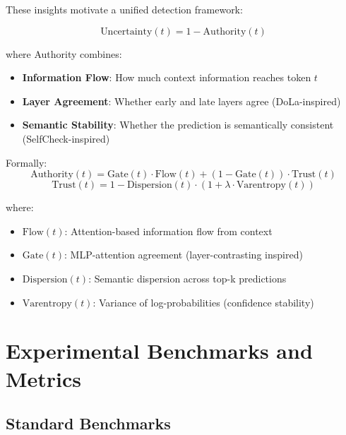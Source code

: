 \documentclass[11pt]{article}
\begin{document}
These insights motivate a unified detection framework:

\begin{equation}
\text{Uncertainty}(t) = 1 - \text{Authority}(t)
\end{equation}

where Authority combines:
\begin{itemize}
    \item \textbf{Information Flow}: How much context information reaches token $t$
    \item \textbf{Layer Agreement}: Whether early and late layers agree (DoLa-inspired)
    \item \textbf{Semantic Stability}: Whether the prediction is semantically consistent (SelfCheck-inspired)
\end{itemize}

Formally:
\begin{equation}
\text{Authority}(t) = \text{Gate}(t) \cdot \text{Flow}(t) + (1 - \text{Gate}(t)) \cdot \text{Trust}(t)
\end{equation}
\begin{equation}
\text{Trust}(t) = 1 - \text{Dispersion}(t) \cdot (1 + \lambda \cdot \text{Varentropy}(t))
\end{equation}

where:
\begin{itemize}
    \item $\text{Flow}(t)$: Attention-based information flow from context
    \item $\text{Gate}(t)$: MLP-attention agreement (layer-contrasting inspired)
    \item $\text{Dispersion}(t)$: Semantic dispersion across top-k predictions
    \item $\text{Varentropy}(t)$: Variance of log-probabilities (confidence stability)
\end{itemize}

\section{Experimental Benchmarks and Metrics}

\subsection{Standard Benchmarks}
\end{document}
